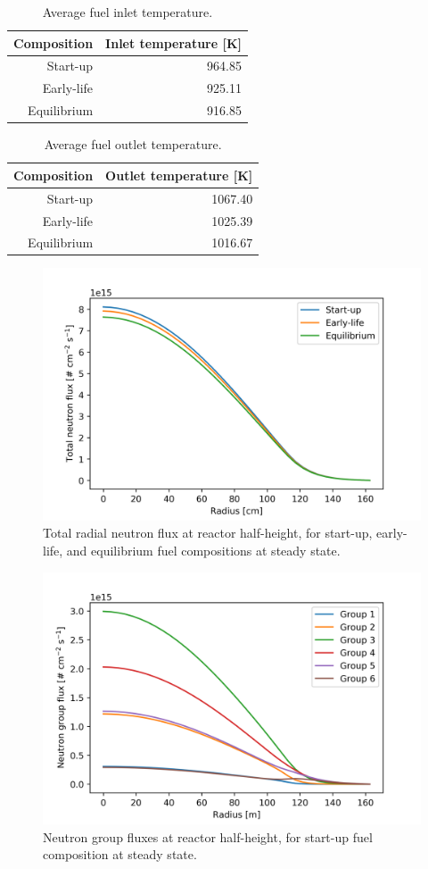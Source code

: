 \documentclass{anstrans}
\begin{document}
\begin{table}[t]
	\centering
	\captionsetup{justification=centering}
	\caption{Average fuel inlet temperature.}
	\begin{tabular}{rr}
		\hline
		{Composition} & {Inlet temperature [K]}\\
		\hline
		Start-up & 964.85\\
		Early-life & 925.11\\
		Equilibrium & 916.85\\
		\hline
	\end{tabular}
	\label{table:inlet}
\end{table}	
%
\begin{table}[t]
	\centering
	\captionsetup{justification=centering}
	\caption{Average fuel outlet temperature.}
	\begin{tabular}{rr}
		\hline
		{Composition} & {Outlet temperature [K]}\\
		\hline
		Start-up & 1067.40\\
		Early-life & 1025.39\\
		Equilibrium & 1016.67\\
		\hline
	\end{tabular}
	\label{table:outlet}
\end{table}	
%
\begin{figure}[b] 
	\centering
	\includegraphics[width=.53\textwidth]{./figures/totalflux}
	\captionsetup{justification=centering}
	\caption{Total radial neutron flux at reactor half-height, for start-up,
	early-life, and equilibrium fuel compositions at steady state.}
	\label{fig:totalflux}
\end{figure} 
%
\begin{figure}[t] 
	\centering
	\includegraphics[width=.53\textwidth]{./figures/stflux}
	\captionsetup{justification=centering}
	\caption{Neutron group fluxes at reactor half-height, for start-up
	fuel composition at steady state.}
	\label{fig:stflux}
\end{figure} 
\end{document}
